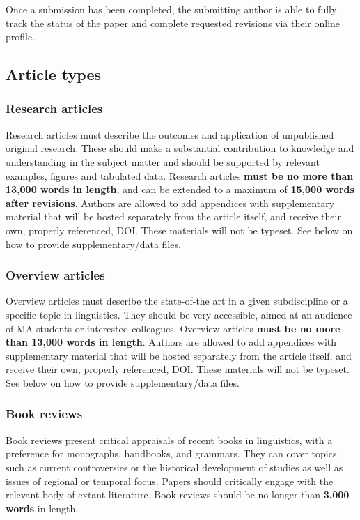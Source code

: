 \documentclass[charis,linguex]{glossa}
\begin{document}
Once a submission has been completed, the submitting author is able to fully track the status of the paper and complete requested revisions via their online profile.

\subsection{Article types}

\subsubsection{Research articles}

Research articles must describe the outcomes and application of unpublished original research. These should make a substantial contribution to knowledge and understanding in the subject matter and should be supported by relevant examples, figures and tabulated data. Research articles \textbf{must be no more than 13,000 words in length}, and can be extended to a maximum of \textbf{15,000 words after revisions}. Authors are allowed to add appendices with supplementary material that will be hosted separately from the article itself, and receive their own, properly referenced, DOI. These materials will not be typeset. See below on how to provide supplementary/data files.

\subsubsection{Overview articles}

Overview articles must describe the state-of-the art in a given subdiscipline or a specific topic in linguistics. They should be very accessible, aimed at an audience of MA students or interested colleagues. Overview articles \textbf{must be no more than 13,000 words in length}. Authors are allowed to add appendices with supplementary material that will be hosted separately from the article itself, and receive their own, properly referenced, DOI. These materials will not be typeset.  See below on how to provide supplementary/data files.

\subsubsection{Book reviews}

Book reviews present critical appraisals of recent books in linguistics, with a preference for monographs, handbooks, and grammars. They can cover topics such as current controversies or the historical development of studies as well as issues of regional or temporal focus. Papers should critically engage with the relevant body of extant literature. Book reviews should be no longer than \textbf{3,000 words} in length.
\end{document}
